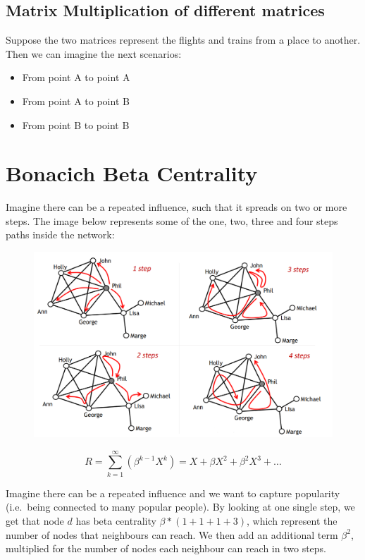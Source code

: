 \documentclass[
  notitlepage,
  onecolumn,
  openany]{book}
\providecommand{\tightlist}{%
  \setlength{\itemsep}{0pt}\setlength{\parskip}{0pt}}
\begin{document}
\hypertarget{matrix-multiplication-of-different-matrices}{%
\subsection{Matrix Multiplication of different matrices}\label{matrix-multiplication-of-different-matrices}}

Suppose the two matrices represent the flights and trains from a place to another. Then we can imagine the next scenarios:

\begin{itemize}
\tightlist
\item
  From point A to point A
\item
  From point A to point B
\item
  From point B to point B
\end{itemize}

\hypertarget{bonacich-beta-centrality-1}{%
\section{Bonacich Beta Centrality}\label{bonacich-beta-centrality-1}}

Imagine there can be a repeated influence, such that it spreads on two or more steps. The image below represents some of the one, two, three and four steps paths inside the network:

\begin{figure}[h!]

{\centering \includegraphics[width=0.5\linewidth]{images/05-Matrices and Beta centrality/Untitled 3} 

}

\end{figure}

\[
R = \sum^\infty_{k=1}(\beta^{k-1}X^k) = X+\beta X^2+\beta^2 X^3+\dots
\]

Imagine there can be a repeated influence and we want to capture popularity (i.e.~being connected to many popular people). By looking at one single step, we get that node \(d\) has beta centrality \(\beta*(1+1+1+3)\), which represent the number of nodes that neighbours can reach. We then add an additional term \(\beta^2\), multiplied for the number of nodes each neighbour can reach in two steps.
\end{document}
